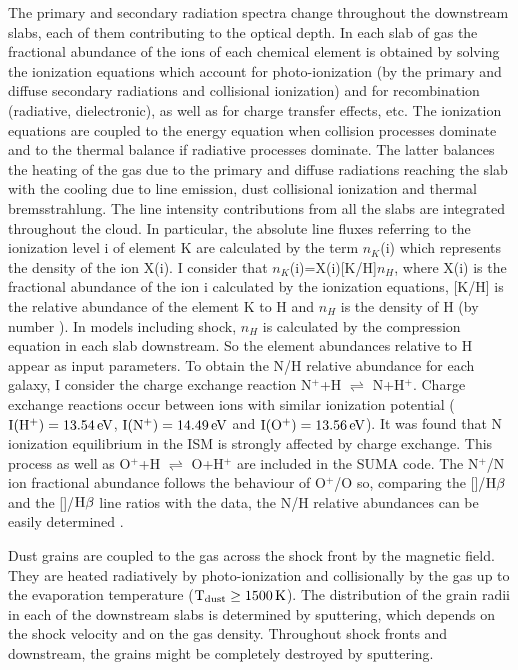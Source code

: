 \documentclass[../main.tex]{subfiles}
\begin{document}
The primary and secondary radiation spectra change throughout the downstream slabs, each of them contributing to the optical depth. 
In each slab of gas the fractional abundance of the ions of each chemical element is obtained by solving the ionization equations which account for photo-ionization (by the primary and diffuse secondary radiations and collisional ionization) and for  recombination (radiative, dielectronic), as well as for charge transfer effects, etc. 
The ionization equations are coupled to the energy equation when collision processes dominate \citep{Cox72} and to the thermal balance if radiative processes dominate. 
The latter balances the heating of the gas due to the primary and diffuse radiations reaching the slab with the cooling due to  
line emission, dust collisional ionization and thermal bremsstrahlung. 
The line intensity contributions from all the slabs are integrated throughout the cloud.
In particular, the absolute line fluxes referring to the ionization level i of element K are calculated by the term $n_K$(i) which represents the density of the ion X(i).
I consider that $n_K$(i)=X(i)[K/H]$n_H$, where X(i) is the fractional abundance of the ion i calculated by the ionization equations, [K/H] is the relative abundance of the element K to H and $n_H$ is the density of H (by number ). 
In models including shock, $n_H$ is calculated by the compression equation in each slab downstream. 
So the element abundances relative to H appear as input parameters.
To obtain the N/H relative abundance for each galaxy, I consider the charge exchange reaction  N$^+$+H $\rightleftharpoons$ N+H$^+$. 
Charge exchange reactions occur between ions with similar ionization potential ($\rm I(H^+)=13.54\,\si{ eV}$, $\rm I(N^+)=14.49\, \si{eV}$ and $\rm I(O^+)=13.56\,\si{ eV}$). 
It was found that N ionization equilibrium in the ISM is strongly affected by charge exchange.  
This process as well as O$^+$+H $\rightleftharpoons$ O+H$^+$  are included in the SUMA code.
The N$^+$/N ion fractional abundance follows the behaviour of O$^+$/O so, comparing the []/$\rm H\beta$   and the []/$\rm H\beta$ line ratios with the data, the N/H relative abundances can be easily determined \citep[see][]{Contini12}.


Dust grains are coupled to the gas across the shock front by the magnetic field. 
They are heated radiatively by photo-ionization and collisionally by the gas up to the evaporation temperature ($\rm T_{\rm dust} \geq 1500\,\si{K}$). 
The distribution of the grain radii in each of the downstream slabs is determined by sputtering, which depends on the shock velocity and on the gas density. 
Throughout shock fronts and downstream, the grains might be completely destroyed by sputtering.
\end{document}
